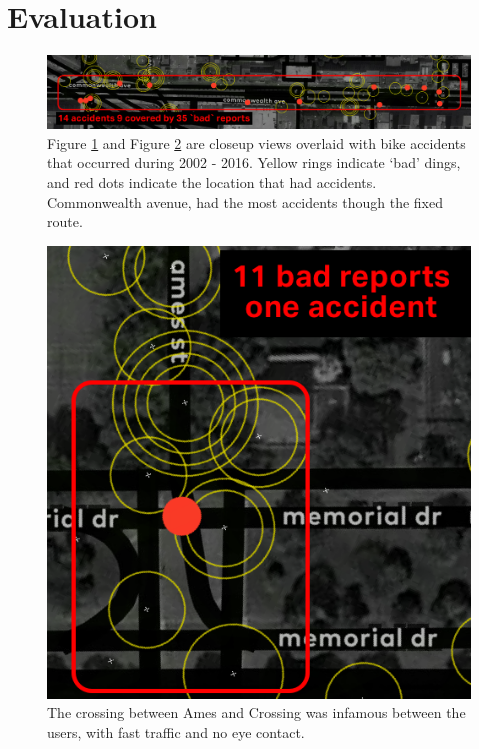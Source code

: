 \section{Evaluation}

\begin{figure}[!htb]
  \includegraphics{chapters/4/fig/overlap_commonwealth.png}               
  \caption[dangerous road]{Figure \ref{fig:map_overlap_commonwealth} and Figure \ref{fig:map_overlap_crossing} are closeup views overlaid with bike accidents that occurred during 2002 - 2016. Yellow rings indicate `bad' dings, and red dots indicate the location that had accidents. Commonwealth avenue, had the most accidents though the fixed route.}
  \label{fig:map_overlap_commonwealth}
\end{figure}

\begin{figure}[!htb]
  \includegraphics{chapters/4/fig/overlap_ames_crossing.png}               
  \caption[dangerous crossing at ames Street]{The crossing between Ames and Crossing was infamous between the users, with fast traffic and no eye contact.}
  \label{fig:map_overlap_crossing}
\end{figure}

